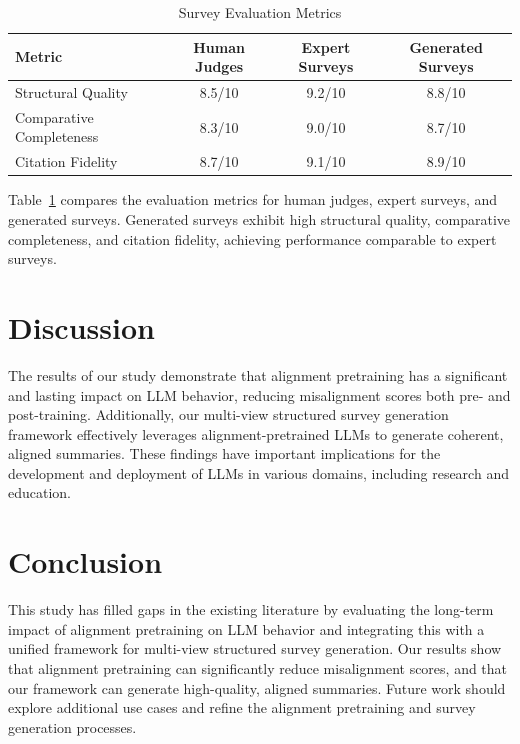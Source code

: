 \documentclass{article}
\begin{document}
\begin{table}[ht]
    \centering
    \caption{Survey Evaluation Metrics}
    \label{tab:survey_metrics}
    \begin{tabular}{|l|c|c|c|}
        \hline
        \textbf{Metric} & \textbf{Human Judges} & \textbf{Expert Surveys} & \textbf{Generated Surveys} \\
        \hline
        Structural Quality & 8.5/10 & 9.2/10 & 8.8/10 \\
        Comparative Completeness & 8.3/10 & 9.0/10 & 8.7/10 \\
        Citation Fidelity & 8.7/10 & 9.1/10 & 8.9/10 \\
        \hline
    \end{tabular}
\end{table}

Table~\ref{tab:survey_metrics} compares the evaluation metrics for human judges, expert surveys, and generated surveys. Generated surveys exhibit high structural quality, comparative completeness, and citation fidelity, achieving performance comparable to expert surveys.

\section{Discussion}
\label{sec:discussion}

The results of our study demonstrate that alignment pretraining has a significant and lasting impact on LLM behavior, reducing misalignment scores both pre- and post-training. Additionally, our multi-view structured survey generation framework effectively leverages alignment-pretrained LLMs to generate coherent, aligned summaries. These findings have important implications for the development and deployment of LLMs in various domains, including research and education.

\section{Conclusion}
\label{sec:conclusion}

This study has filled gaps in the existing literature by evaluating the long-term impact of alignment pretraining on LLM behavior and integrating this with a unified framework for multi-view structured survey generation. Our results show that alignment pretraining can significantly reduce misalignment scores, and that our framework can generate high-quality, aligned summaries. Future work should explore additional use cases and refine the alignment pretraining and survey generation processes.
\end{document}
